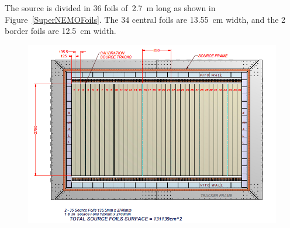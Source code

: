 \documentclass[main.tex]{subfiles}
\begin{document}
\NI The source is divided in 36 foils of~2.7~m long as shown in Figure~\ref{SuperNEMOFoils}. The 34 central foils are 13.55~cm width, and the 2 border foils are 12.5~cm width.


\begin{figure}[h!]
\begin{center}
\includegraphics[scale=0.33]{pictures/Chap3/foil.png}

\end{center}
\end{figure}
\end{document}
